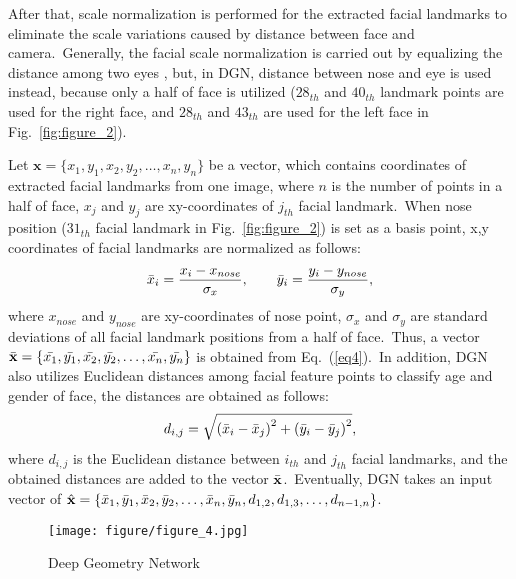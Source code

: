\documentclass[10pt,twocolumn,letterpaper]{article}
\begin{document}
After that, scale normalization is performed for the extracted facial landmarks to eliminate the scale variations caused by distance between face and camera.~Generally, the facial scale normalization is carried out by equalizing the distance among two eyes \cite{Chen2006}, but, in DGN, distance between nose and eye is used instead, because only a half of face is utilized ($28_{th}$ and $40_{th}$ landmark points are used for the right face, and $28_{th}$ and $43_{th}$ are used for the left face in Fig.~\ref{fig:figure_2}). 

Let $\mathbf{x}=\{x_1,y_1,x_2,y_2,\ldots,x_n,y_n \}$ be a vector, which contains coordinates of extracted facial landmarks from one image, where $n$ is the number of points in a half of face, $x_j$ and $y_j$ are xy-coordinates of $j_{th}$ facial landmark.~When nose position ($31_{th}$ facial landmark in Fig.~\ref{fig:figure_2}) is set as a basis point, x,y coordinates of facial landmarks are normalized as follows:
\begin{equation}
\label{eq4}
    \Bar{x}_i=\frac{x_{i}-x_{nose}}{\sigma_x},\qquad\Bar{y}_i=\frac{y_{i}-y_{nose}}{\sigma_y},
\end{equation}
where $x_{nose}$ and $y_{nose}$ are xy-coordinates of nose point, $\sigma_x$ and $\sigma_y$ are standard deviations of all facial landmark positions from a half of face.~Thus, a vector $\Bar{\mathbf{x}}=\{\Bar{x_1},\Bar{y_1},\Bar{x_2},\Bar{y_2},\ldots,\Bar{x_n},\Bar{y_n} \}$ is obtained from Eq.~(\ref{eq4}).~In addition, DGN also utilizes Euclidean distances among facial feature points to classify age and gender of face, the distances are obtained as follows:
\begin{equation}
\label{eq5}
    d_{i,j}=\sqrt{\left(\Bar{x}_i-\Bar{x}_j\right)^2+\left(\Bar{y}_i-\Bar{y}_j\right)^2},
\end{equation}
where $d_{i,j}$ is the Euclidean distance between $i_{th}$ and $j_{th}$ facial landmarks, and the obtained distances are added to the vector $\Bar{\mathbf{x}}$.~Eventually, DGN takes an input vector of $\Hat{\mathbf{x}}=\{\Bar{x}_1,\Bar{y}_1,\Bar{x}_2,\Bar{y}_2,\ldots,\Bar{x}_n,\Bar{y}_n,d_{1,2},d_{1,3},\ldots,d_{n-1,n}\}$.
\begin{figure}[!h]
    \centering
    \texttt{[image: figure/figure\_4.jpg]}
    \caption{Deep Geometry Network}
    \label{fig:figure_4}
\end{figure}
\end{document}
